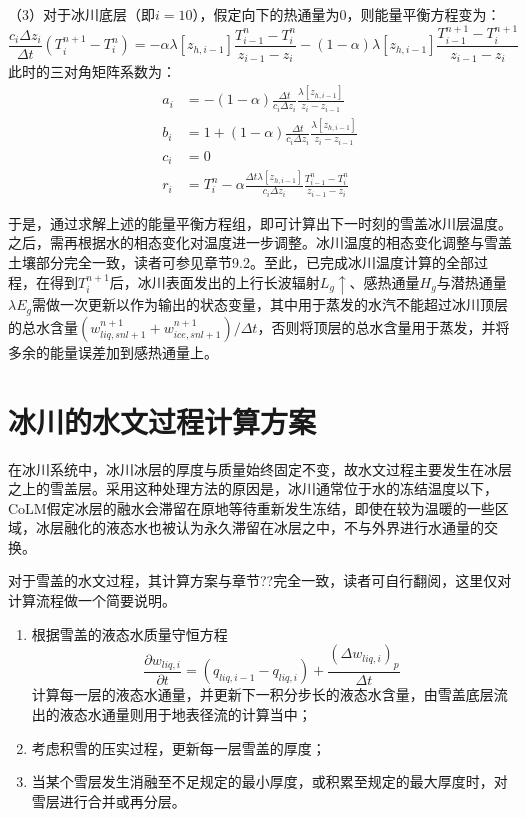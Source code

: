 （3）对于冰川底层（即$i=10$），假定向下的热通量为0，则能量平衡方程变为：
\begin{equation}
    \frac{c_{i} \Delta z_{i}}{\Delta t}\left(T_{i}^{n+1}-T_{i}^{n}\right)=-\alpha \lambda\left[z_{h, i-1}\right] \frac{T_{i-1}^{n}-T_{i}^{n}}{z_{i-1}-z_{i}}-(1-\alpha) \lambda\left[z_{h, i-1}\right] \frac{T_{i-1}^{n+1}-T_{i}^{n+1}}{z_{i-1}-z_{i}}
\end{equation}
此时的三对角矩阵系数为：
\begin{equation}
\begin{aligned}
a_{i} &= -(1-\alpha) \frac{\Delta t}{c_{i} \Delta z_{i}} \frac{\lambda\left[z_{h, i-1}\right]}{z_{i}-z_{i-1}} \\
b_{i} &= 1+(1-\alpha) \frac{\Delta t}{c_{i} \Delta z_{i}} \frac{\lambda\left[z_{h, i-1}\right]}{z_{i}-z_{i-1}} \\
c_{i} &= 0 \\
r_{i} &= T_{i}^{n}-\alpha \frac{\Delta t \lambda\left[z_{h, i-1}\right]}{c_{i} \Delta z_{i}} \frac{T_{i-1}^{n}-T_{i}^{n}}{z_{i-1}-z_{i}}
\end{aligned}
\end{equation}

于是，通过求解上述的能量平衡方程组，即可计算出下一时刻的雪盖冰川层温度。之后，需再根据水的相态变化对温度进一步调整。冰川温度的相态变化调整与雪盖土壤部分完全一致，读者可参见章节9.2。至此，已完成冰川温度计算的全部过程，在得到$T^{n+1}_i$后，冰川表面发出的上行长波辐射$L_g\uparrow$、感热通量$H_g$与潜热通量$\lambda E_g$需做一次更新以作为输出的状态变量，其中用于蒸发的水汽不能超过冰川顶层的总水含量$\left(w^{n+1}_{liq,snl+1}+w^{n+1}_{ice,snl+1}\right)/\Delta t$，否则将顶层的总水含量用于蒸发，并将多余的能量误差加到感热通量上。


\section{冰川的水文过程计算方案}
在冰川系统中，冰川冰层的厚度与质量始终固定不变，故水文过程主要发生在冰层之上的雪盖层。采用这种处理方法的原因是，冰川通常位于水的冻结温度以下，CoLM假定冰层的融水会滞留在原地等待重新发生冻结，即使在较为温暖的一些区域，冰层融化的液态水也被认为永久滞留在冰层之中，不与外界进行水通量的交换。

对于雪盖的水文过程，其计算方案与章节??完全一致，读者可自行翻阅，这里仅对计算流程做一个简要说明。
\begin{enumerate}
    \item 根据雪盖的液态水质量守恒方程
    \begin{equation}
            \frac{\partial w_{liq,i}}{\partial t}=\left(q_{liq,i-1}-q_{liq,i}\right)+\frac{{\left(\Delta w_{liq,i}\right)}_p}{\Delta t}
    \end{equation}
    计算每一层的液态水通量，并更新下一积分步长的液态水含量，由雪盖底层流出的液态水通量则用于地表径流的计算当中；
    \item 考虑积雪的压实过程，更新每一层雪盖的厚度；
    \item 当某个雪层发生消融至不足规定的最小厚度，或积累至规定的最大厚度时，对雪层进行合并或再分层。
\end{enumerate}

